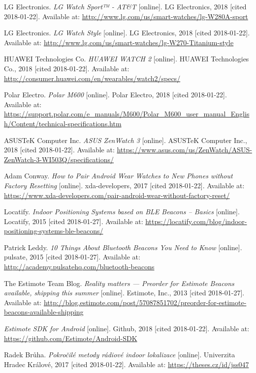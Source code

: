 \begin{thebibliography}{10}
LG Electronics. \textit{LG Watch Sport™ - AT\&T} [online]. LG Electronics, 2018 [cited 2018-01-22]. Available at: \url{http://www.lg.com/us/smart-watches/lg-W280A-sport}

LG Electronics. \textit{LG Watch Style} [online]. LG Electronics, 2018 [cited 2018-01-22]. Available at: \url{http://www.lg.com/us/smart-watches/lg-W270-Titanium-style}

HUAWEI Technologies Co. \textit{HUAWEI WATCH 2} [online]. HUAWEI Technologies Co., 2018 [cited 2018-01-22]. Available at: \url{http://consumer.huawei.com/en/wearables/watch2/specs/}

Polar Electro. \textit{Polar M600} [online]. Polar Electro, 2018 [cited 2018-01-22]. Available at: \url{https://support.polar.com/e_manuals/M600/Polar_M600_user_manual_English/Content/technical-specifications.htm}

ASUSTeK Computer Inc. \textit{ASUS ZenWatch 3} [online]. ASUSTeK Computer Inc., 2018 [cited 2018-01-22]. Available at: \url{https://www.asus.com/us/ZenWatch/ASUS-ZenWatch-3-WI503Q/specifications/}

Adam Conway. \textit{How to Pair Android Wear Watches to New Phones without Factory Resetting} [online]. xda-developers, 2017 [cited 2018-01-22]. Available at: \url{https://www.xda-developers.com/pair-android-wear-without-factory-reset/}

Locatify. \textit{Indoor Positioning Systems based on BLE Beacons – Basics} [online]. Locatify, 2015 [cited 2018-01-27]. Available at: \url{https://locatify.com/blog/indoor-positioning-systems-ble-beacons/}

Patrick Leddy. \textit{10 Things About Bluetooth Beacons You Need to Know} [online]. pulsate, 2015 [cited 2018-01-27]. Available at: \url{http://academy.pulsatehq.com/bluetooth-beacons}

The Estimote Team Blog. \textit{Reality matters — Preorder for Estimote Beacons available, shipping this summer} [online]. Estimote, Inc., 2013 [cited 2018-01-27]. Available at: \url{http://blog.estimote.com/post/57087851702/preorder-for-estimote-beacons-available-shipping}

\textit{Estimote SDK for Android} [online]. Github, 2018 [cited 2018-01-22]. Available at: \url{https://github.com/Estimote/Android-SDK}

Radek Brůha. \textit{Pokročilé metody rádiové indoor lokalizace} [online]. Univerzita Hradec Králové, 2017 [cited 2018-01-22]. Available at: \url{https://theses.cz/id/jss047}


\end{thebibliography}
